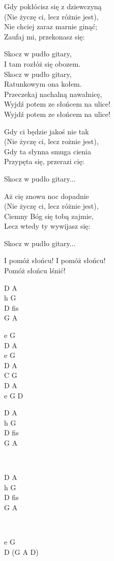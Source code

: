 \begin{text}
    Gdy pokłócisz się z dziewczyną\\
    (Nie życzę ci, lecz różnie jest),\\
    Nie chciej zaraz marnie ginąć;\\
    Zaufaj mi, przekonasz się:

    \vin Skocz w pudło gitary,\\
    \vin I tam rozłóż się obozem.\\
    \vin Skocz w pudło gitary,\\
    \vin Ratunkowym ona kołem.\\
    \vin Przeczekaj nachalną nawałnicę,\\
    \vin Wyjdź potem ze słońcem na ulice!\\
    \vin Wyjdź potem ze słońcem na ulice!

    Gdy ci będzie jakoś nie tak\\
    (Nie życzę ci, lecz rożnie jest),\\
    Gdy ta słynna smuga cienia\\
    Przypęta się, przerazi cię:

    \vin Skocz w pudło gitary...

    Aż cię znowu noc dopadnie\\
    (Nie życzę ci, lecz różnie jest),\\
    Ciemny Bóg się tobą zajmie,\\
    Lecz wtedy ty wywijasz się:

    \vin Skocz w pudło gitary...

    \vin I pomóż słońcu! I pomóż słońcu!\\
    \vin Pomóż słońcu lśnić!
\end{text}
\begin{chord}
    D A\\
    h G\\
    D fis\\
    G A

    e G\\
    D A\\
    e G\\
    D A\\
    C G\\
    D A\\
    e G D

    D A\\
    h G\\
    D fis\\
    G A

    ~

    D A\\
    h G\\
    D fis\\
    G A

    ~

    e G\\
    D (G A D)
\end{chord}
